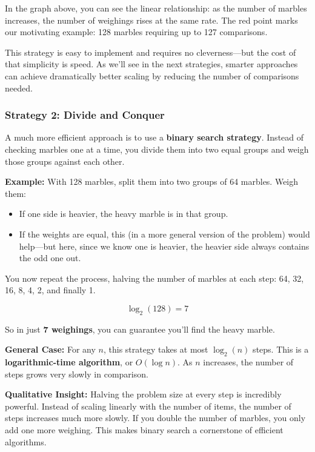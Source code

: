 \noindent In the graph above, you can see the linear relationship: as the number of marbles increases, the number of weighings rises at the same rate. The red point marks our motivating example: 128 marbles requiring up to 127 comparisons.

This strategy is easy to implement and requires no cleverness—but the cost of that simplicity is speed. As we'll see in the next strategies, smarter approaches can achieve dramatically better scaling by reducing the number of comparisons needed.


\subsubsection{Strategy 2: Divide and Conquer}

A much more efficient approach is to use a \textbf{binary search strategy}. Instead of checking marbles one at a time, you divide them into two equal groups and weigh those groups against each other.

\medskip

\noindent\textbf{Example:} With 128 marbles, split them into two groups of 64 marbles. Weigh them:
\begin{itemize}
  \item If one side is heavier, the heavy marble is in that group.
  \item If the weights are equal, this (in a more general version of the problem) would help—but here, since we know one is heavier, the heavier side always contains the odd one out.
\end{itemize}

You now repeat the process, halving the number of marbles at each step: 64, 32, 16, 8, 4, 2, and finally 1.

\[
\log_2(128) = 7
\]

So in just \textbf{7 weighings}, you can guarantee you’ll find the heavy marble.

\medskip

\noindent\textbf{General Case:} For any \( n \), this strategy takes at most \( \log_2(n) \) steps. This is a \textbf{logarithmic-time algorithm}, or \( O(\log n) \). As \( n \) increases, the number of steps grows very slowly in comparison.

\medskip

\noindent\textbf{Qualitative Insight:} Halving the problem size at every step is incredibly powerful. Instead of scaling linearly with the number of items, the number of steps increases much more slowly. If you double the number of marbles, you only add one more weighing. This makes binary search a cornerstone of efficient algorithms.

